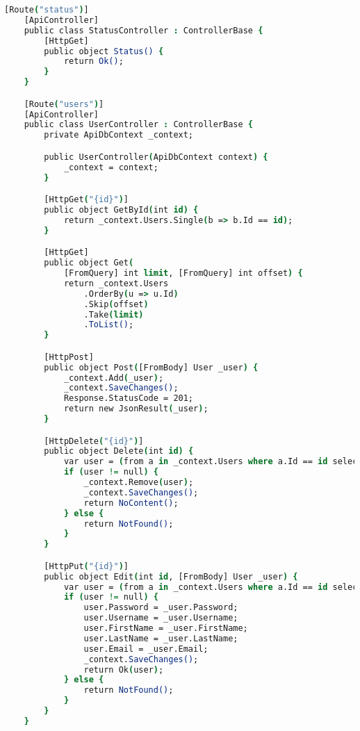 \begin{lstlisting}[language=csh,caption={ASP.NET Core routing and endpoint logic},breaklines=true,label={lst:aspnetEndpoints}]
    [Route("status")]
    [ApiController]
    public class StatusController : ControllerBase {
        [HttpGet]
        public object Status() {
            return Ok();
        }
    }

    [Route("users")]
    [ApiController]
    public class UserController : ControllerBase {
        private ApiDbContext _context;

        public UserController(ApiDbContext context) {
            _context = context;
        }

        [HttpGet("{id}")]
        public object GetById(int id) {
            return _context.Users.Single(b => b.Id == id);
        }

        [HttpGet]
        public object Get(
            [FromQuery] int limit, [FromQuery] int offset) {
            return _context.Users
                .OrderBy(u => u.Id)
                .Skip(offset)
                .Take(limit)
                .ToList();
        }

        [HttpPost]
        public object Post([FromBody] User _user) {
            _context.Add(_user);
            _context.SaveChanges();
            Response.StatusCode = 201;
            return new JsonResult(_user);
        }

        [HttpDelete("{id}")]
        public object Delete(int id) {
            var user = (from a in _context.Users where a.Id == id select a).FirstOrDefault();
            if (user != null) {
                _context.Remove(user);
                _context.SaveChanges();
                return NoContent();
            } else {
                return NotFound();
            }
        }

        [HttpPut("{id}")]
        public object Edit(int id, [FromBody] User _user) {
            var user = (from a in _context.Users where a.Id == id select a).FirstOrDefault();
            if (user != null) {
                user.Password = _user.Password;
                user.Username = _user.Username;
                user.FirstName = _user.FirstName;
                user.LastName = _user.LastName;
                user.Email = _user.Email;
                _context.SaveChanges();
                return Ok(user);
            } else {
                return NotFound();
            }
        }
    }
\end{lstlisting}
